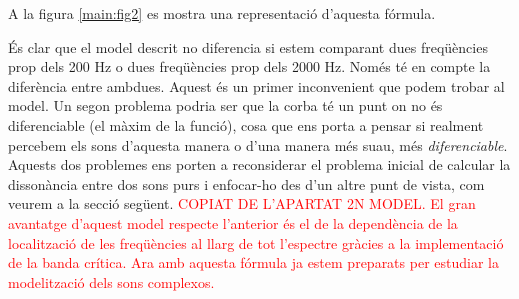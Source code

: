 \documentclass{article}
\theoremstyle{math}
\newcommand{\0}{\ensuremath{\vb{0}}}
\begin{document}
A la figura \ref{main:fig2} es mostra una representació d'aquesta fórmula.
\begin{center}
    
    \label{main:fig2}
\end{center}
És clar que el model descrit no diferencia si estem comparant dues freqüències prop dels 200 Hz o dues freqüències prop dels 2000 Hz. Només té en compte la diferència entre ambdues. Aquest és un primer inconvenient que podem trobar al model. Un segon problema podria ser que la corba té un punt on no és diferenciable (el màxim de la funció), cosa que ens porta a pensar si realment percebem els sons d'aquesta manera o d'una manera més suau, més \textit{diferenciable}. Aquests dos problemes ens porten a reconsiderar el problema inicial de calcular la dissonància entre dos sons purs i enfocar-ho des d'un altre punt de vista, com veurem a la secció següent.
\textcolor{red}{COPIAT DE L'APARTAT 2N MODEL. El gran avantatge d'aquest model respecte l'anterior és el de la dependència de la localització de les freqüències al llarg de tot l'espectre gràcies a la implementació de la banda crítica. Ara amb aquesta fórmula ja estem preparats per estudiar la modelització dels sons complexos.}
\end{document}
